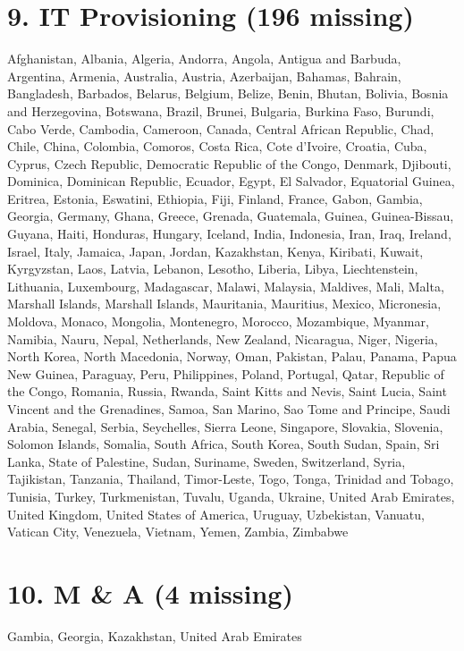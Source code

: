 \documentclass{article}
\begin{document}
\section*{9. IT Provisioning (196 missing)}
Afghanistan, Albania, Algeria, Andorra, Angola, Antigua and Barbuda, Argentina, Armenia, Australia, Austria, Azerbaijan, Bahamas, Bahrain, Bangladesh, Barbados, Belarus, Belgium, Belize, Benin, Bhutan, Bolivia, Bosnia and Herzegovina, Botswana, Brazil, Brunei, Bulgaria, Burkina Faso, Burundi, Cabo Verde, Cambodia, Cameroon, Canada, Central African Republic, Chad, Chile, China, Colombia, Comoros, Costa Rica, Cote d'Ivoire, Croatia, Cuba, Cyprus, Czech Republic, Democratic Republic of the Congo, Denmark, Djibouti, Dominica, Dominican Republic, Ecuador, Egypt, El Salvador, Equatorial Guinea, Eritrea, Estonia, Eswatini, Ethiopia, Fiji, Finland, France, Gabon, Gambia, Georgia, Germany, Ghana, Greece, Grenada, Guatemala, Guinea, Guinea-Bissau, Guyana, Haiti, Honduras, Hungary, Iceland, India, Indonesia, Iran, Iraq, Ireland, Israel, Italy, Jamaica, Japan, Jordan, Kazakhstan, Kenya, Kiribati, Kuwait, Kyrgyzstan, Laos, Latvia, Lebanon, Lesotho, Liberia, Libya, Liechtenstein, Lithuania, Luxembourg, Madagascar, Malawi, Malaysia, Maldives, Mali, Malta, Marshall Islands, Marshall Islands, Mauritania, Mauritius, Mexico, Micronesia, Moldova, Monaco, Mongolia, Montenegro, Morocco, Mozambique, Myanmar, Namibia, Nauru, Nepal, Netherlands, New Zealand, Nicaragua, Niger, Nigeria, North Korea, North Macedonia, Norway, Oman, Pakistan, Palau, Panama, Papua New Guinea, Paraguay, Peru, Philippines, Poland, Portugal, Qatar, Republic of the Congo, Romania, Russia, Rwanda, Saint Kitts and Nevis, Saint Lucia, Saint Vincent and the Grenadines, Samoa, San Marino, Sao Tome and Principe, Saudi Arabia, Senegal, Serbia, Seychelles, Sierra Leone, Singapore, Slovakia, Slovenia, Solomon Islands, Somalia, South Africa, South Korea, South Sudan, Spain, Sri Lanka, State of Palestine, Sudan, Suriname, Sweden, Switzerland, Syria, Tajikistan, Tanzania, Thailand, Timor-Leste, Togo, Tonga, Trinidad and Tobago, Tunisia, Turkey, Turkmenistan, Tuvalu, Uganda, Ukraine, United Arab Emirates, United Kingdom, United States of America, Uruguay, Uzbekistan, Vanuatu, Vatican City, Venezuela, Vietnam, Yemen, Zambia, Zimbabwe

\section*{10. M \& A (4 missing)}
Gambia, Georgia, Kazakhstan, United Arab Emirates
\end{document}
